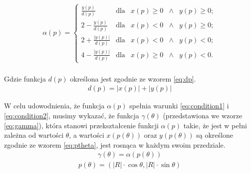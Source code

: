    		\begin{align}\label{eq:alpha1}
        	\alpha\left( p\right) = \left\{
        		\begin{array}{lclcr}
        			\frac{y\left(p\right)}{d\left(p\right)} & \text{dla} &
        			x\left(p\right) \geqslant 0 & \wedge & y\left(p\right) \geqslant 0; \\
        			2 - \frac{y\left(p\right)}{d\left(p\right)} & \text{dla} &
        			x\left(p\right) < 0 & \wedge & y\left(p\right) \geqslant 0; \\
        			2 + \frac{\left|y\left(p\right)\right|}{d\left(p\right)} & \text{dla} &
        			x\left(p\right) < 0 & \wedge & y\left(p\right) < 0; \\
        			4 - \frac{\left|y\left(p\right)\right|}{d\left(p\right)} & \text{dla} &
        			x\left(p\right) \geqslant 0 & \wedge & y\left(p\right) < 0.
        		\end{array}
        	\right.
        \end{align}\\
    Gdzie funkcja $d\left(p\right)$ określona jest zgodnie ze wzorem \ref{eq:dp}.
    \begin{align}\label{eq:dp}
        	d\left(p\right) = \left|x\left(p\right)\right| + \left|y\left(p\right)\right|
    \end{align}
    
     W celu udowodnienia, że funkcja $\alpha\left(p\right)$ spełnia warunki \ref{eq:condition1} i \ref{eq:condition2}, musimy wykazać, że funkcja $\gamma\left(\theta\right)$ (przedstawiona we wzorze \ref{eq:gamma}), która stanowi przekształcenie funkcji $\alpha\left(p\right)$ takie, że jest w pełni zależna od wartości $\theta$, a wartości $x\left(p\left(\theta\right)\right)$ oraz $y\left(p\left(\theta\right)\right)$ są określone zgodnie ze wzorem \ref{eq:ptheta}, jest rosnąca w każdym swoim przedziale.
     \begin{align}\label{eq:gamma}
        	\gamma\left(\theta\right) = \alpha\left(p\left(\theta\right)\right)
     \end{align}
     \begin{align}\label{eq:ptheta}
        	p\left(\theta\right) = \left( 
        		\left|R\right| \cdot \cos \theta , 
        		\left|R\right| \cdot \sin \theta
        	\right)
     \end{align}
     
    

